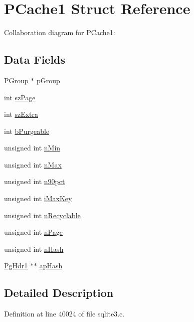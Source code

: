 \hypertarget{struct_p_cache1}{}\section{P\+Cache1 Struct Reference}
\label{struct_p_cache1}


Collaboration diagram for P\+Cache1\+:
\subsection*{Data Fields}
\begin{DoxyCompactItemize}
\item 
\hyperlink{struct_p_group}{P\+Group} $\ast$ \hyperlink{struct_p_cache1_a602f5f72c82f657ab4e3003e2761d4f5}{p\+Group}
\item 
int \hyperlink{struct_p_cache1_a0ead96b04a1cc6dc6ec781782e82d052}{sz\+Page}
\item 
int \hyperlink{struct_p_cache1_aa6d33a46ecc20cbe1700c74a12b4fb14}{sz\+Extra}
\item 
int \hyperlink{struct_p_cache1_a75cf18f61ac5e03a6d9822e78cfbdac3}{b\+Purgeable}
\item 
unsigned int \hyperlink{struct_p_cache1_ad7d171213abe001b8e7263c4bcd5221b}{n\+Min}
\item 
unsigned int \hyperlink{struct_p_cache1_abb1923b8422bf5f73704009a86caf91b}{n\+Max}
\item 
unsigned int \hyperlink{struct_p_cache1_a500c26d9d8c6891b7baf7a274a410f2a}{n90pct}
\item 
unsigned int \hyperlink{struct_p_cache1_a690bbea3436a73a6f1fa2655c4ff4c59}{i\+Max\+Key}
\item 
unsigned int \hyperlink{struct_p_cache1_ac8eee41aaf37858478a0e29b0c6e60ab}{n\+Recyclable}
\item 
unsigned int \hyperlink{struct_p_cache1_a8ffbf07cd3533c78ec7cbfb4129580f8}{n\+Page}
\item 
unsigned int \hyperlink{struct_p_cache1_a019adadb03d76527faa2cb8a12251497}{n\+Hash}
\item 
\hyperlink{struct_pg_hdr1}{Pg\+Hdr1} $\ast$$\ast$ \hyperlink{struct_p_cache1_a94d4f471940d8bc81ad553a57c70e5b7}{ap\+Hash}
\end{DoxyCompactItemize}


\subsection{Detailed Description}


Definition at line 40024 of file sqlite3.\+c.



